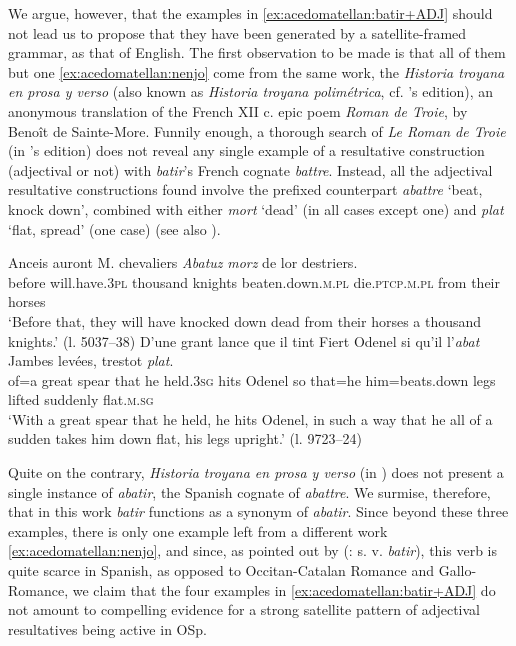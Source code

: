 \documentclass[output=paper,colorlinks,citecolor=brown,
]{langscibook}
\begin{document}
\noindent We argue, however, that the examples in \ref{ex:acedomatellan:batir+ADJ} should not lead us to propose that they have been generated by a satellite-framed grammar, as that of English. The first observation to be made is that all of them but one \ref{ex:acedomatellan:nenjo} come from the same work, the \textit{Historia troyana en prosa y verso} (also known as \textit{Historia troyana polimétrica}, cf. \citeauthor{Larrea2012}'s \citeyear{Larrea2012} edition), an anonymous translation of the French XII c. epic poem \textit{Roman de Troie}, by Benoît de Sainte-More. Funnily enough, a thorough search of \textit{Le Roman de Troie} (in \citeauthor{Joly1871}'s \citeyear{Joly1871} edition) does not reveal any single example of a resultative construction (adjectival or not) with \textit{batir}’s French cognate \textit{battre}. Instead, all the adjectival resultative constructions found involve the prefixed counterpart \textit{abattre} ‘beat, knock down’, combined with either \textit{mort} ‘dead’ (in all cases except one) and \textit{plat} ‘flat, spread’ (one case) (see also ).

\ea
  \ea
    \gll Anceis auront M. chevaliers \textit{Abatuz} \textit{morz} de lor destriers.\\
before will.have.\textsc{3pl} thousand knights beaten.down.\textsc{m}.\textsc{pl} die.\textsc{ptcp}.\textsc{m}.\textsc{pl} from their horses\\
    \glt `Before that, they will have knocked down dead from their horses a thousand knights.’ (l. 5037–38)
  \ex
    \gll D’une grant lance que il tint Fiert Odenel si qu’il l’\textit{abat} Jambes levées, trestot \textit{plat}.\\
of=a great spear that he held.\textsc{3sg} hits Odenel so that=he him=beats.down legs lifted suddenly flat.\textsc{m}.\textsc{sg}\\
    \glt `With a great spear that he held, he hits Odenel, in such a way that he all of a sudden takes him down flat, his legs upright.’ (l. 9723–24)
  \z 
\z 

\noindent Quite on the contrary, \textit{Historia troyana en prosa y verso} (in \citealt{Larrea2012}) does not present a single instance of \textit{abatir}, the Spanish cognate of \textit{abattre}. We surmise, therefore, that in this work \textit{batir} functions as a synonym of \textit{abatir}. Since beyond these three examples, there is only one example left from a different work \ref{ex:acedomatellan:nenjo}, and since, as pointed out by \citeauthor{Corominas1984} (\citeyear{Corominas1984}: s. v. \textit{batir}), this verb is quite scarce in Spanish, as opposed to Occitan-Catalan Romance and Gallo-Romance, we claim that the four examples in  \ref{ex:acedomatellan:batir+ADJ} do not amount to compelling evidence for a strong satellite pattern of adjectival resultatives being active in OSp.
\end{document}
